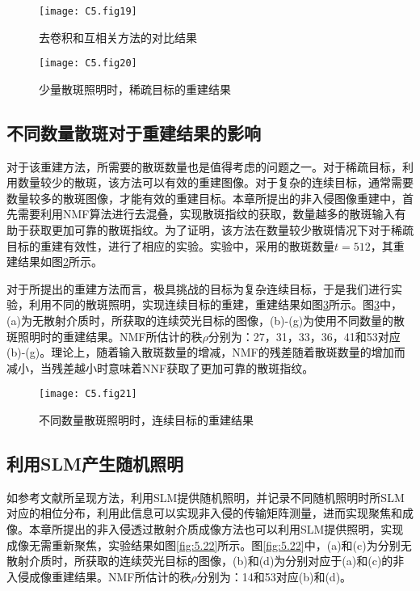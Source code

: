 \begin{figure}[htp]
	\centering
	\texttt{[image: C5.fig19]}
	\caption{去卷积和互相关方法的对比结果}
	\label{fig:5.19}
\end{figure}

\begin{figure}[htp]
	\centering
	\texttt{[image: C5.fig20]}
	\caption{少量散斑照明时，稀疏目标的重建结果}
	\label{fig:5.20}
\end{figure}

\subsection{不同数量散斑对于重建结果的影响}

对于该重建方法，所需要的散斑数量也是值得考虑的问题之一。对于稀疏目标，利用数量较少的散斑，该方法可以有效的重建图像。对于复杂的连续目标，通常需要数量较多的散斑图像，才能有效的重建目标。本章所提出的非入侵图像重建中，首先需要利用NMF算法进行去混叠，实现散斑指纹的获取，数量越多的散斑输入有助于获取更加可靠的散斑指纹。为了证明，该方法在数量较少散斑情况下对于稀疏目标的重建有效性，进行了相应的实验。实验中，采用的散斑数量$t = 512$，其重建结果如图\ref{fig:5.20}所示。

对于所提出的重建方法而言，极具挑战的目标为复杂连续目标，于是我们进行实验，利用不同的散斑照明，实现连续目标的重建，重建结果如图\ref{fig:5.21}所示。图\ref{fig:5.21}中，(a)为无散射介质时，所获取的连续荧光目标的图像，(b)-(g)为使用不同数量的散斑照明时的重建结果。NMF所估计的秩$\rho$分别为：27，31，33，36，41和53对应(b)-(g)。理论上，随着输入散斑数量的增减，NMF的残差随着散斑数量的增加而减小，当残差越小时意味着NNF获取了更加可靠的散斑指纹。

\begin{figure}[htp]
	\centering
	\texttt{[image: C5.fig21]}
	\caption{不同数量散斑照明时，连续目标的重建结果}
	\label{fig:5.21}
\end{figure}

\subsection{利用SLM产生随机照明}

如参考文献\cite{boniface_non_invasive_2020}所呈现方法，利用SLM提供随机照明，并记录不同随机照明时所SLM对应的相位分布，利用此信息可以实现非入侵的传输矩阵测量，进而实现聚焦和成像。本章所提出的非入侵透过散射介质成像方法也可以利用SLM提供照明，实现成像无需重新聚焦，实验结果如图\ref{fig:5.22}所示。图\ref{fig:5.22}中，(a)和(c)为分别无散射介质时，所获取的连续荧光目标的图像，(b)和(d)为分别对应于(a)和(c)的非入侵成像重建结果。NMF所估计的秩$\rho$分别为：14和53对应(b)和(d)。


